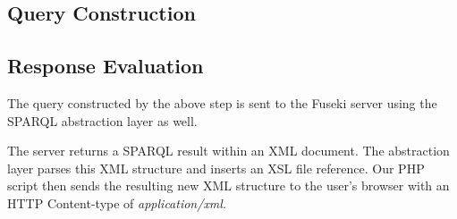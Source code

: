 \subsection{Query Construction}

\subsection{Response Evaluation}
The query constructed by the above step is sent to the Fuseki server using the SPARQL abstraction layer as well.

The server returns a SPARQL result within an XML document. The abstraction layer parses this XML structure and inserts an XSL file reference. Our PHP script then sends the resulting new XML structure to the user's browser with an HTTP Content-type of \textit{application/xml}.

